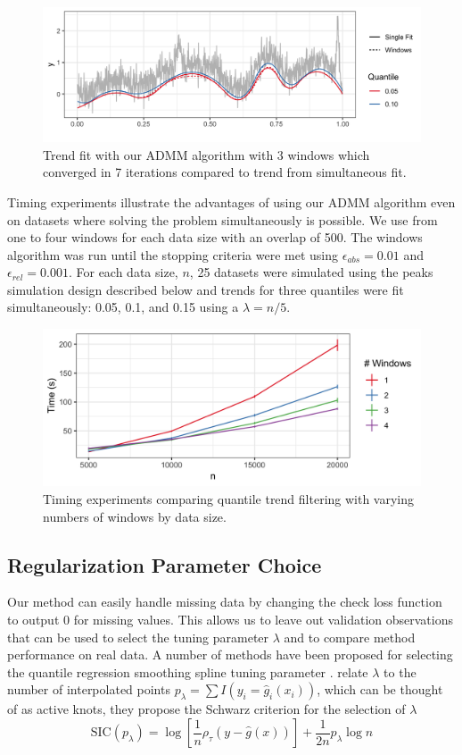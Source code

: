 \documentclass[12pt]{article}
\begin{document}
	
	\begin{figure}
		\centering
		\caption{Trend fit with our ADMM algorithm with 3 windows which converged in 7 iterations compared to trend from simultaneous fit.}
		\includegraphics[width = 0.8\linewidth]{Figures/admm_windows.png}
	\end{figure}

	Timing experiments illustrate the advantages of using our ADMM algorithm even on datasets where solving the problem simultaneously is possible. We use from one to four windows for each data size with an overlap of 500. The windows algorithm was run until the stopping criteria were met using $\epsilon_{abs} = 0.01$ and $\epsilon_{rel} = 0.001$. For each data size, $n$, 25 datasets were simulated using the peaks simulation design described below and trends for three quantiles were fit simultaneously: 0.05, 0.1, and 0.15 using a $\lambda = n/5$.
	
	\begin{figure}[!h] 
		\centering
		\caption{Timing experiments comparing quantile trend filtering with varying numbers of windows by data size.}
		\includegraphics[width = 0.7\linewidth]{Figures/Fig_timing_experiment.png}
	\end{figure}

	\subsection{Regularization Parameter Choice}
	\label{sec:lambda_choice}
	Our method can easily handle missing data by changing the check loss function to output 0 for missing values. This allows us to leave out validation observations that can be used to select the tuning parameter $\lambda$ and to compare method performance on real data. A number of methods have been proposed for selecting the quantile regression smoothing spline tuning parameter \cite{yuan2006gacv}.  \cite{KoenkerNgPortnoy1994} relate $\lambda$ to the number of interpolated points $p_{\lambda} = \sum I(y_i = \widehat{g}_i(x_i))$, which can be thought of as active knots, they propose the Schwarz criterion for the selection of $\lambda$
	\begin{equation}
	\mbox{SIC}(p_{\lambda}) = \log[\frac{1}{n}\rho_{\tau}(y - \widehat{g}(x))] + \frac{1}{2n}p_{\lambda}\log n
	\end{equation}
	
\end{document}
